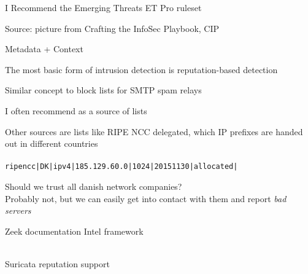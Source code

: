 \documentclass[Screen16to9,17pt]{foils}
\begin{document}
I Recommend the Emerging Threats ET Pro ruleset





Source: picture from Crafting the InfoSec Playbook, CIP

Metadata + Context




\begin{list2}
\item The most basic form of intrusion detection is reputation-based detection
\item Similar concept to block lists for SMTP spam relays
\item I often recommend  as a source of lists
\item Other sources are lists like RIPE NCC delegated, which IP prefixes are handed out in different countries\\
\\
\verb+ripencc|DK|ipv4|185.129.60.0|1024|20151130|allocated|+
\item Should we trust all danish network companies?\\
Probably not, but we can easily get into contact with them and report \emph{bad servers}
\end{list2}


\begin{list1}
\item Zeek documentation Intel framework\\
\\
\item Suricata reputation support\\
\end{list1}





\end{document}
